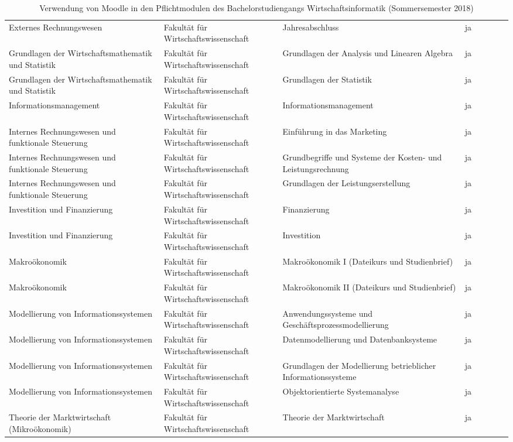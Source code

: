 \begin{sidewaystable}
{\begin{tabular}{lllrrrrr}
Externes Rechnungswesen & Fakultät für Wirtschaftswissenschaft & Jahresabschluss & ja\\
Grundlagen der Wirtschaftsmathematik und Statistik & Fakultät für Wirtschaftswissenschaft & Grundlagen der Analysis und Linearen Algebra & ja\\
Grundlagen der Wirtschaftsmathematik und Statistik & Fakultät für Wirtschaftswissenschaft & Grundlagen der Statistik & ja\\
Informationsmanagement & Fakultät für Wirtschaftswissenschaft & Informationsmanagement & ja\\
Internes Rechnungswesen und funktionale Steuerung & Fakultät für Wirtschaftswissenschaft & Einführung in das Marketing & ja\\
Internes Rechnungswesen und funktionale Steuerung & Fakultät für Wirtschaftswissenschaft & Grundbegriffe und Systeme der Kosten- und Leistungsrechnung & ja\\
Internes Rechnungswesen und funktionale Steuerung & Fakultät für Wirtschaftswissenschaft & Grundlagen der Leistungserstellung & ja\\
Investition und Finanzierung & Fakultät für Wirtschaftswissenschaft & Finanzierung & ja\\
Investition und Finanzierung & Fakultät für Wirtschaftswissenschaft & Investition & ja\\
Makroökonomik & Fakultät für Wirtschaftswissenschaft & Makroökonomik I (Dateikurs und Studienbrief) & ja\\
Makroökonomik & Fakultät für Wirtschaftswissenschaft & Makroökonomik II (Dateikurs und Studienbrief) & ja\\
Modellierung von Informationssystemen & Fakultät für Wirtschaftswissenschaft & Anwendungssysteme und Geschäftsprozessmodellierung & ja\\
Modellierung von Informationssystemen & Fakultät für Wirtschaftswissenschaft & Datenmodellierung und Datenbanksysteme & ja\\
Modellierung von Informationssystemen & Fakultät für Wirtschaftswissenschaft & Grundlagen der Modellierung betrieblicher Informationssysteme & ja\\
Modellierung von Informationssystemen & Fakultät für Wirtschaftswissenschaft & Objektorientierte Systemanalyse & ja\\
Theorie der Marktwirtschaft (Mikroökonomik) & Fakultät für Wirtschaftswissenschaft & Theorie der Marktwirtschaft & ja\\

\end{tabular}}
\caption{Verwendung von Moodle in den Pflichtmodulen des Bachelorstudiengangs Wirtschaftsinformatik (Sommersemester 2018)}
\label{tab:VerwendungVonMoodle}
\end{sidewaystable}